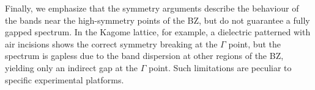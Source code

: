 Finally, we emphasize that the symmetry arguments describe the behaviour of the bands near the high-symmetry points of the BZ, but do not guarantee a fully gapped spectrum. In the Kagome lattice, for example, a dielectric patterned with air incisions shows the correct symmetry breaking at the $\Gamma$ point, but the spectrum is gapless due to the band dispersion at other regions of the BZ, yielding only an indirect gap at the $\Gamma$ point. Such limitations are peculiar to specific experimental platforms. 

